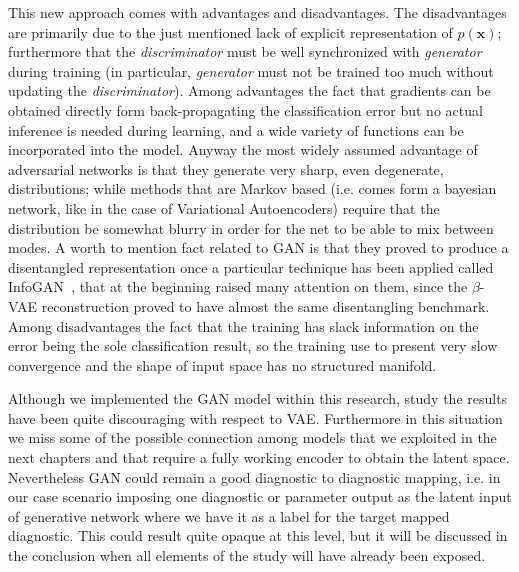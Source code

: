 This new approach comes with advantages and disadvantages. 
%
The disadvantages are primarily due to the just mentioned lack of explicit representation of $p(\bm{x})$; furthermore that the \textit{discriminator} must be well synchronized with \textit{generator} during training (in particular, \textit{generator} must not be trained too much without updating the \textit{discriminator}).
%
Among advantages the fact that gradients can be obtained directly form back-propagating the classification error but no actual inference is needed during learning, and a wide variety of functions can be incorporated into the model.
Anyway the most widely assumed advantage of adversarial networks is that they generate very sharp, even degenerate, distributions; while methods that are Markov based (i.e. comes form a bayesian network, like in the case of Variational Autoencoders) require that the distribution be somewhat blurry in order for the net to be able to mix between modes.
A worth to mention fact related to GAN is that they proved to produce a disentangled representation once a particular technique has been applied called InfoGAN~\cite{NIPS2016_6399}, that at the beginning raised many attention on them, since the $\beta$-VAE reconstruction proved to have almost the same disentangling benchmark.
%
Among disadvantages the fact that the training has slack information on the error being the sole classification result, so the training use to present very slow convergence and the shape of input space has no structured manifold.

Although we implemented the GAN model within this research, study the results have been quite discouraging with respect to VAE. Furthermore in this situation we miss some of the possible connection among models that we exploited in the next chapters and that require a fully working encoder to obtain the latent space.
Nevertheless GAN could remain a good diagnostic to diagnostic mapping, i.e. in our case scenario imposing one diagnostic or parameter output as the latent input of generative network where we have it as a label for the target mapped diagnostic.
This could result quite opaque at this level, but it will be discussed in the conclusion when all elements of the study will have already been exposed.


